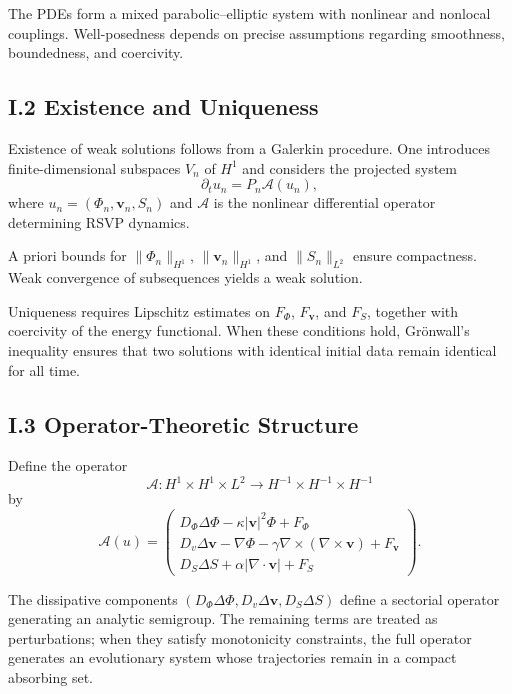 \documentclass[12pt]{article}
\begin{document}
The PDEs form a mixed parabolic–elliptic system with nonlinear and 
nonlocal couplings.  
Well-posedness depends on precise assumptions regarding smoothness, 
boundedness, and coercivity.

\subsection*{I.2 Existence and Uniqueness}

Existence of weak solutions follows from a Galerkin procedure.  
One introduces finite-dimensional subspaces $V_n$ of $H^1$ and considers the 
projected system
\[
\partial_t u_n = P_n \mathcal{A}(u_n),
\]
where $u_n = (\Phi_n, \mathbf{v}_n, S_n)$ and $\mathcal{A}$ is the nonlinear 
differential operator determining RSVP dynamics.

A priori bounds for $\|\Phi_n\|_{H^1}$, $\|\mathbf{v}_n\|_{H^1}$, and 
$\|S_n\|_{L^2}$ ensure compactness.  
Weak convergence of subsequences yields a weak solution.

Uniqueness requires Lipschitz estimates on $F_\Phi$, $F_{\mathbf{v}}$, and 
$F_S$, together with coercivity of the energy functional.  
When these conditions hold, Grönwall’s inequality ensures that two solutions 
with identical initial data remain identical for all time.

\subsection*{I.3 Operator-Theoretic Structure}

Define the operator
\[
\mathcal{A} :
H^1 \times H^1 \times L^2 \longrightarrow H^{-1} \times H^{-1} \times H^{-1}
\]
by
\[
\mathcal{A}(u) = 
\begin{pmatrix}
D_\Phi \Delta \Phi - \kappa |\mathbf{v}|^2 \Phi + F_\Phi \\
D_v \Delta \mathbf{v} - \nabla \Phi - \gamma \nabla \times (\nabla \times \mathbf{v}) + F_{\mathbf{v}} \\
D_S \Delta S + \alpha |\nabla \cdot \mathbf{v}| + F_S
\end{pmatrix}.
\]

The dissipative components $(D_\Phi \Delta \Phi, D_v \Delta \mathbf{v}, 
D_S \Delta S)$ define a sectorial operator generating an analytic semigroup.  
The remaining terms are treated as perturbations; when they satisfy 
monotonicity constraints, the full operator generates an evolutionary system 
whose trajectories remain in a compact absorbing set.
\end{document}

